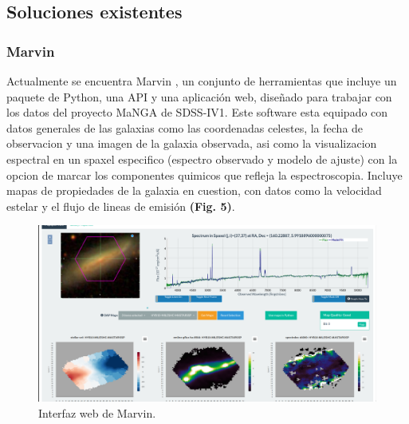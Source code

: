 \documentclass[9pt,twocolumn,a4paper]{opticajnl}
\begin{document}
\subsection*{Soluciones existentes}
 \subsubsection*{Marvin}
Actualmente se encuentra Marvin \cite{marvin}, un conjunto de herramientas que incluye un paquete de Python, una API y una aplicación web, diseñado para trabajar con los datos del proyecto MaNGA de SDSS-IV1.
Este software esta equipado con datos generales de las galaxias como las coordenadas celestes, la fecha de observacion y una imagen de la galaxia observada, asi como la visualizacion espectral en un spaxel especifico (espectro observado y modelo de ajuste) con la opcion de marcar los componentes quimicos que refleja la espectroscopia. Incluye mapas de propiedades de la galaxia en cuestion, con datos como la velocidad estelar y el flujo de lineas de emisión \textbf{(Fig. 5)}.
\begin{figure}
	\centering
  	\includegraphics[width=0.8\linewidth]{interfaceMarvin}
	\caption{Interfaz web de Marvin.}
	\label{fig:interfacemarvin}
\end{figure}
\end{document}
